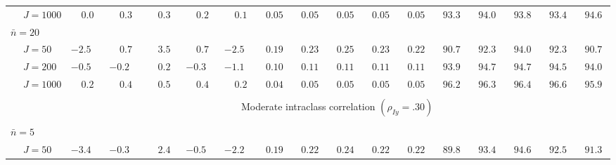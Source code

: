 \begin{sidewaystable}
\begin{threeparttable}
\begin{tabular}{llccccccccccccccc}
 & \nopagebreak $\;J=1000$  & $\phantom{-}0.0\phantom{0}$ & $\phantom{-}0.3\phantom{0}$ & $\phantom{-}0.3\phantom{0}$ & $\phantom{-}0.2\phantom{0}$ & $\phantom{-}0.1\phantom{0}$ & $\phantom{0}0.05\phantom{0}$ & $\phantom{0}0.05\phantom{0}$ & $\phantom{0}0.05\phantom{0}$ & $\phantom{0}0.05\phantom{0}$ & $\phantom{0}0.05\phantom{0}$ & $\phantom{0}93.3\phantom{0}$ & $\phantom{0}94.0\phantom{0}$ & $\phantom{0}93.8\phantom{0}$ & $\phantom{0}93.4\phantom{0}$ & $\phantom{0}94.6\phantom{0}$ \\
\multicolumn{4}{l}{$\bar{n}=20$} \\  & \nopagebreak $\;J=50$  & ${-}2.5\phantom{0}$ & $\phantom{-}0.7\phantom{0}$ & $\phantom{-}3.5\phantom{0}$ & $\phantom{-}0.7\phantom{0}$ & ${-}2.5\phantom{0}$ & $\phantom{0}0.19\phantom{0}$ & $\phantom{0}0.23\phantom{0}$ & $\phantom{0}0.25\phantom{0}$ & $\phantom{0}0.23\phantom{0}$ & $\phantom{0}0.22\phantom{0}$ & $\phantom{0}90.7\phantom{0}$ & $\phantom{0}92.3\phantom{0}$ & $\phantom{0}94.0\phantom{0}$ & $\phantom{0}92.3\phantom{0}$ & $\phantom{0}90.7\phantom{0}$ \\
 & \nopagebreak $\;J=200$  & ${-}0.5\phantom{0}$ & ${-}0.2\phantom{0}$ & $\phantom{-}0.2\phantom{0}$ & ${-}0.3\phantom{0}$ & ${-}1.1\phantom{0}$ & $\phantom{0}0.10\phantom{0}$ & $\phantom{0}0.11\phantom{0}$ & $\phantom{0}0.11\phantom{0}$ & $\phantom{0}0.11\phantom{0}$ & $\phantom{0}0.11\phantom{0}$ & $\phantom{0}93.9\phantom{0}$ & $\phantom{0}94.7\phantom{0}$ & $\phantom{0}94.7\phantom{0}$ & $\phantom{0}94.5\phantom{0}$ & $\phantom{0}94.0\phantom{0}$ \\
 & \nopagebreak $\;J=1000$  & $\phantom{-}0.2\phantom{0}$ & $\phantom{-}0.4\phantom{0}$ & $\phantom{-}0.5\phantom{0}$ & $\phantom{-}0.4\phantom{0}$ & $\phantom{-}0.2\phantom{0}$ & $\phantom{0}0.04\phantom{0}$ & $\phantom{0}0.05\phantom{0}$ & $\phantom{0}0.05\phantom{0}$ & $\phantom{0}0.05\phantom{0}$ & $\phantom{0}0.05\phantom{0}$ & $\phantom{0}96.2\phantom{0}$ & $\phantom{0}96.3\phantom{0}$ & $\phantom{0}96.4\phantom{0}$ & $\phantom{0}96.6\phantom{0}$ & $\phantom{0}95.9\phantom{0}$ \\
[0.5ex]\hline\\[-1.6ex] 
& & \multicolumn{15}{c}{Moderate intraclass correlation $(\rho_{Iy}=.30)$} \\[0.6ex]\hline\\[-1.8ex]
\multicolumn{4}{l}{$\bar{n}=5$} \\  & \nopagebreak $\;J=50$  & ${-}3.4\phantom{0}$ & ${-}0.3\phantom{0}$ & $\phantom{-}2.4\phantom{0}$ & ${-}0.5\phantom{0}$ & ${-}2.2\phantom{0}$ & $\phantom{0}0.19\phantom{0}$ & $\phantom{0}0.22\phantom{0}$ & $\phantom{0}0.24\phantom{0}$ & $\phantom{0}0.22\phantom{0}$ & $\phantom{0}0.22\phantom{0}$ & $\phantom{0}89.8\phantom{0}$ & $\phantom{0}93.4\phantom{0}$ & $\phantom{0}94.6\phantom{0}$ & $\phantom{0}92.5\phantom{0}$ & $\phantom{0}91.3\phantom{0}$ \\

\end{tabular}
\end{threeparttable}
\end{sidewaystable}
